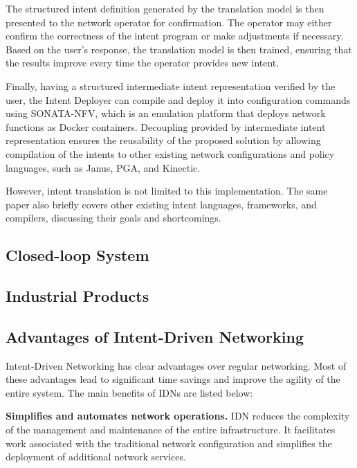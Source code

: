 The structured intent definition generated by the translation model is then presented to the network operator for confirmation. The operator may either confirm the correctness of the intent program or make adjustments if necessary. Based on the user’s response, the translation model is then trained, ensuring that the results improve every time the operator provides new intent.

Finally, having a structured intermediate intent representation verified by the user, the Intent Deployer can compile and deploy it into configuration commands using SONATA-NFV, which is an emulation platform that deploys network functions as Docker containers. Decoupling provided by intermediate intent representation ensures the reusability of the proposed solution by allowing compilation of the intents to other existing network configurations and policy languages, such as Janus, PGA, and Kinectic.

However, intent translation is not limited to this implementation. The same paper \cite[20]{Jacobs2018} also briefly covers other existing intent languages, frameworks, and compilers, discussing their goals and shortcomings.
	

\subsection{Closed-loop System}


\subsection{Industrial Products}



\subsection{Advantages of Intent-Driven Networking}

Intent-Driven Networking has clear advantages over regular networking. Most of these advantages lead to significant time savings and improve the agility of the entire system\cite{Kolibri}. The main benefits of IDNs are listed below:\cite[11]{MartinezJulia2022}

\textbf{Simplifies and automates network operations.} IDN reduces the complexity of the management and maintenance of the entire infrastructure. It facilitates work associated with the traditional network configuration and simplifies the deployment of additional network services.

